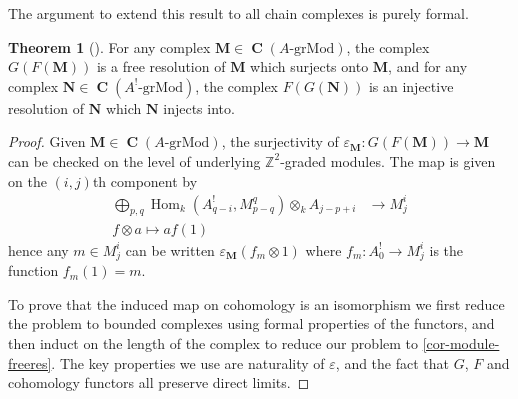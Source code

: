 \documentclass[a4paper]{article}
\theoremstyle{definition}
\newtheorem{theorem}[defn]{Theorem}
\theoremstyle{remark}
\newcommand{\grMod}{\ensuremath{\text{-grMod}}}
\DeclareMathOperator{\Hom}{\text{Hom}}
\DeclareMathOperator{\Ch}{\mathbf{C}}
\begin{document}
The argument to extend this result to all chain complexes is purely formal.

\begin{theorem}[]
    \label{thm-eisenbud-res}
    For any complex \(\mathbf{M}\in \Ch(A\grMod)\), the complex
    \(G(F(\mathbf{M}))\) is a free resolution of \(\mathbf{M}\) which surjects
    onto \(\mathbf{M}\), and for any complex \(\mathbf{N}\in \Ch(A^!\grMod)\),
    the complex \(F(G(\mathbf{N}))\) is an injective resolution of
    \(\mathbf{N}\) which \(\mathbf{N}\) injects into.
    \begin{proof}
        Given \(\mathbf{M}\in \Ch(A\grMod)\), the surjectivity of
        \(\varepsilon_\mathbf{M}: G(F(\mathbf{M}))\rightarrow \mathbf{M}\) can
        be checked on the level of underlying \(\mathbb{Z}^2\)-graded
        modules. The map is given on the \((i,j)\)th component by 
        \begin{align*}
            \bigoplus_{p,q} \Hom_k(A^!_{q-i}, M^q_{p-q}) \otimes_k A_{j-p+i}
            &\longrightarrow M^i_j \\
            f\otimes a \mapsto af(1)
        \end{align*} 
        hence any \(m\in M^i_j\) can be written
        \(\varepsilon_\mathbf{M}(f_m\otimes 1)\) where \(f_m: A^!_{0}\rightarrow
        M^i_j\) is the function \(f_m(1)=m\). 

        To prove that the induced map on cohomology is an isomorphism we first
        reduce the problem to bounded complexes using formal properties of the
        functors, and then induct on the length of the complex to reduce our
        problem to \cref{cor-module-freeres}. The key properties we use are
        naturality of \(\varepsilon\), and the fact that \(G\), \(F\) and
        cohomology functors all preserve direct limits.


\end{proof}
\end{theorem}
\end{document}
